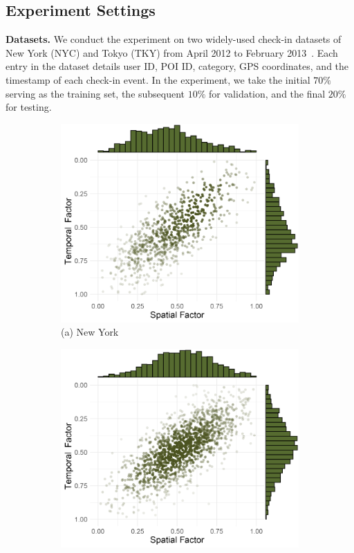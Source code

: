 \documentclass[letterpaper]{article} %
\begin{document}
\subsection{Experiment Settings}
\noindent \textbf{Datasets.}
We conduct the experiment on two widely-used check-in datasets of New York (NYC) and Tokyo (TKY) from April 2012 to February 2013~\cite{yang2014modeling}.
Each entry in the dataset details user ID, POI ID, category, GPS coordinates, and the timestamp of each check-in event.
In the experiment, we take the initial $70\%$ serving as the training set, the subsequent $10\%$ for validation, and the final $20\%$ for testing.

\begin{figure}[!th]
\centering
\begin{subfigure}{.24\textwidth}
  \centering
  \includegraphics[width=\linewidth]{4_nyc.pdf}
  \scriptsize (a) New York
\end{subfigure}%
\begin{subfigure}{.24\textwidth}
  \centering
  \includegraphics[width=\linewidth]{4_tky.pdf}

\end{subfigure}
\end{figure}
\end{document}

